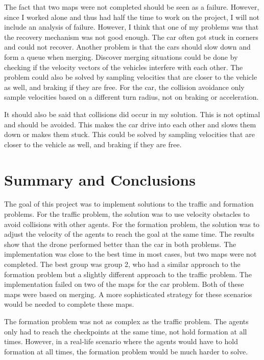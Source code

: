 \documentclass[a4paper,12pt]{article}
\begin{document}
\begin{multicols}{2}
The fact that two maps were not completed should be seen as a failure. However, since I worked alone and thus had half the time to work on the project, I will not include an analysis of failure. However, I think that one of my problems was that the recovery mechanism was not good enough. The car often got stuck in corners and could not recover. Another problem is that the cars should slow down and form a queue when merging. Discover merging situations could be done by checking if the velocity vectors of the vehicles interfere with each other. The problem could also be solved by sampling velocities that are closer to the vehicle as well, and braking if they are free. For the car, the collision avoidance only sample velocities based on a different turn radius, not on braking or acceleration.

It should also be said that collisions did occur in my solution. This is not optimal and should be avoided. This makes the car drive into each other and slows them down or makes them stuck. This could be solved by sampling velocities that are closer to the vehicle as well, and braking if they are free.


\section{Summary and Conclusions}
\label{sec:summary}

The goal of this project was to implement solutions to the traffic and formation problems. For the traffic problem, the solution was to use velocity obstacles to avoid collisions with other agents. For the formation problem, the solution was to adjust the velocity of the agents to reach the goal at the same time. The results show that the drone performed better than the car in both problems. The implementation was close to the best time in most cases, but two maps were not completed. The best group was group 2, who had a similar approach to the formation problem but a slightly different approach to the traffic problem. The implementation failed on two of the maps for the car problem. Both of these maps were based on merging. A more sophisticated strategy for these scenarios would be needed to complete these maps.

The formation problem was not as complex as the traffic problem. The agents only had to reach the checkpoints at the same time, not hold formation at all times. However, in a real-life scenario where the agents would have to hold formation at all times, the formation problem would be much harder to solve. 


\end{multicols}
\clearpage


\end{document}

